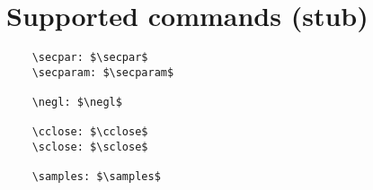 \documentclass{article}
\begin{document}
\section{Supported commands (stub)}

\begin{lstlisting}
    \secpar: $\secpar$
    \secparam: $\secparam$

    \negl: $\negl$

    \cclose: $\cclose$
    \sclose: $\sclose$

    \samples: $\samples$
\end{lstlisting}
    
\end{document}
